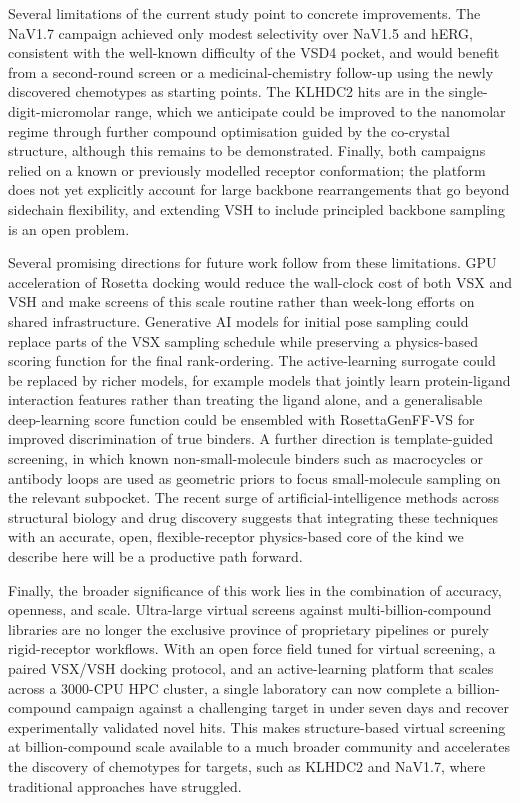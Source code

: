 \documentclass[11pt]{article}
\begin{document}
Several limitations of the current study point to concrete improvements.
The NaV1.7 campaign achieved only modest selectivity over NaV1.5 and
hERG, consistent with the well-known difficulty of the VSD4 pocket, and
would benefit from a second-round screen or a medicinal-chemistry
follow-up using the newly discovered chemotypes as starting points.
The KLHDC2 hits are in the single-digit-micromolar range, which we
anticipate could be improved to the nanomolar regime through further
compound optimisation guided by the co-crystal structure, although this
remains to be demonstrated. Finally, both campaigns relied on a known or
previously modelled receptor conformation; the platform does not yet
explicitly account for large backbone rearrangements that go beyond
sidechain flexibility, and extending VSH to include principled
backbone sampling is an open problem.

Several promising directions for future work follow from these
limitations. GPU acceleration of Rosetta docking would reduce the
wall-clock cost of both VSX and VSH and make screens of this scale
routine rather than week-long efforts on shared infrastructure.
Generative AI models for initial pose sampling could replace parts of the
VSX sampling schedule while preserving a physics-based scoring function
for the final rank-ordering. The active-learning surrogate could be
replaced by richer models, for example models that jointly learn
protein-ligand interaction features rather than treating the ligand
alone, and a generalisable deep-learning score function could be
ensembled with RosettaGenFF-VS for improved discrimination of true
binders. A further direction is template-guided screening, in which
known non-small-molecule binders such as macrocycles or antibody loops
are used as geometric priors to focus small-molecule sampling on the
relevant subpocket. The recent surge of artificial-intelligence methods
across structural biology and drug discovery suggests that integrating
these techniques with an accurate, open, flexible-receptor physics-based
core of the kind we describe here will be a productive path forward.

Finally, the broader significance of this work lies in the combination of
accuracy, openness, and scale. Ultra-large virtual screens against
multi-billion-compound libraries are no longer the exclusive province of
proprietary pipelines or purely rigid-receptor workflows. With an open
force field tuned for virtual screening, a paired VSX/VSH docking
protocol, and an active-learning platform that scales across a
3000-CPU HPC cluster, a single laboratory can now complete a
billion-compound campaign against a challenging target in under seven
days and recover experimentally validated novel hits. This makes
structure-based virtual screening at billion-compound scale available to
a much broader community and accelerates the discovery of chemotypes for
targets, such as KLHDC2 and NaV1.7, where traditional approaches have
struggled.



\end{document}
